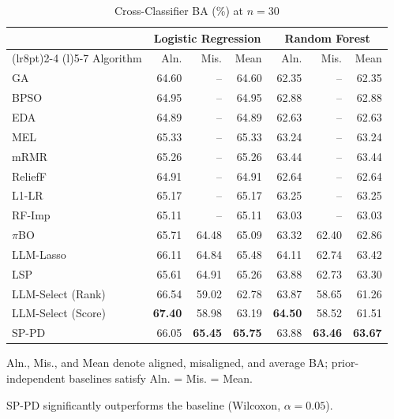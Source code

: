 \begin{table}[!t]
\centering
\begin{threeparttable}
\caption{Cross-Classifier BA (\%) at $n = 30$}
\label{tab:clinical_downstream}
\scriptsize
\setlength{\tabcolsep}{3.6pt}
\renewcommand{\arraystretch}{1.07}
\begin{tabular}{@{}lrrr@{\hspace{8pt}}rrr@{}}
\toprule
 & \multicolumn{3}{c}{Logistic Regression} & \multicolumn{3}{c}{Random Forest} \\
\cmidrule(lr{8pt}){2-4} \cmidrule(l){5-7}
Algorithm & Aln. & Mis. & Mean & Aln. & Mis. & Mean \\
\midrule
GA                 & 64.60\rlap{\textsuperscript{*}} & -- & 64.60\rlap{\textsuperscript{*}} & 62.35\rlap{\textsuperscript{*}} & -- & 62.35\rlap{\textsuperscript{*}} \\
BPSO               & 64.95\rlap{\textsuperscript{*}} & -- & 64.95 & 62.88\rlap{\textsuperscript{*}} & -- & 62.88 \\
EDA                & 64.89 & -- & 64.89 & 62.63\rlap{\textsuperscript{*}} & -- & 62.63 \\
MEL                & 65.33 & -- & 65.33 & 63.24 & -- & 63.24 \\
mRMR               & 65.26 & -- & 65.26 & 63.44 & -- & 63.44 \\
ReliefF            & 64.91\rlap{\textsuperscript{*}} & -- & 64.91 & 62.64\rlap{\textsuperscript{*}} & -- & 62.64\rlap{\textsuperscript{*}} \\
L1-LR              & 65.17\rlap{\textsuperscript{*}} & -- & 65.17\rlap{\textsuperscript{*}} & 63.25 & -- & 63.25 \\
RF-Imp             & 65.11 & -- & 65.11 & 63.03 & -- & 63.03 \\
\midrule
$\pi$BO            & 65.71 & 64.48 & 65.09 & 63.32 & 62.40 & 62.86 \\
LLM-Lasso          & 66.11 & 64.84 & 65.48 & 64.11 & 62.74 & 63.42 \\
LSP                & 65.61 & 64.91 & 65.26 & 63.88 & 62.73 & 63.30 \\
LLM-Select (Rank)  & 66.54 & 59.02\rlap{\textsuperscript{*}} & 62.78\rlap{\textsuperscript{*}} & 63.87 & 58.65\rlap{\textsuperscript{*}} & 61.26\rlap{\textsuperscript{*}} \\
LLM-Select (Score) & \textbf{67.40} & 58.98\rlap{\textsuperscript{*}} & 63.19 & \textbf{64.50} & 58.52\rlap{\textsuperscript{*}} & 61.51 \\
\midrule
SP-PD              & 66.05 & \textbf{65.45} & \textbf{65.75} & 63.88 & \textbf{63.46} & \textbf{63.67} \\
\bottomrule
\end{tabular}
\begin{tablenotes}[flushleft]
\scriptsize
\item Aln., Mis., and Mean denote aligned, misaligned, and average BA; prior-independent baselines satisfy Aln. = Mis. = Mean.
\item[*] SP-PD significantly outperforms the baseline (Wilcoxon, $\alpha = 0.05$).
\end{tablenotes}
\end{threeparttable}
\end{table}
